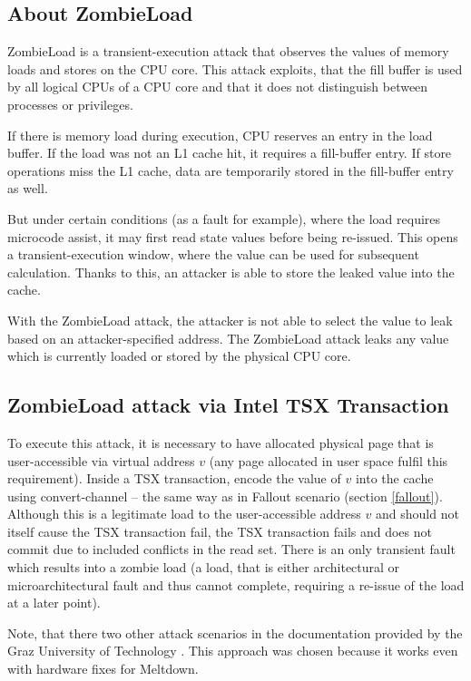 \documentclass[11pt,a4paper,titlepage]{article}
\begin{document}
        \subsection{About ZombieLoad}
            ZombieLoad is a transient-execution attack that observes the values of memory loads and stores on the CPU core. This attack exploits, that the fill buffer is used by all logical CPUs of a CPU core and that it does not distinguish between processes or privileges.
                
            If there is memory load during execution, CPU reserves an entry in the load buffer. If the load was not an L1 cache hit, it requires a fill-buffer entry. If store operations miss the L1 cache, data are temporarily stored in the fill-buffer entry as well.
            
            But under certain conditions (as a fault for example), where the load requires microcode assist, it may first read state values before being re-issued. This opens a transient-execution window, where the value can be used for subsequent calculation. Thanks to this, an attacker is able to store the leaked value into the cache.
            
            With the ZombieLoad attack, the attacker is not able to select the value to leak based on an attacker-specified address. The ZombieLoad attack leaks any value which is currently loaded or stored by the physical CPU core.
    
        \subsection{ZombieLoad attack via Intel TSX Transaction}
            To execute this attack, it is necessary to have allocated physical page that is user-accessible via virtual address $v$ (any page allocated in user space fulfil this requirement). Inside a TSX transaction, encode the value of $v$ into the cache using convert-channel -- the same way as in Fallout scenario (section \ref{fallout}). Although this is a legitimate load to the user-accessible address $v$ and should not itself cause the TSX transaction fail, the TSX transaction fails and does not commit due to included conflicts in the read set. There is an only transient fault which results into a zombie load (a load, that is either architectural or microarchitectural fault and thus cannot complete, requiring a re-issue of the load at a later point).
            
            Note, that there two other attack scenarios in the documentation provided by the Graz University of Technology \cite{web:zombieloaddocumentation}. This approach was chosen because it works even with hardware fixes for Meltdown.
            
\end{document}
